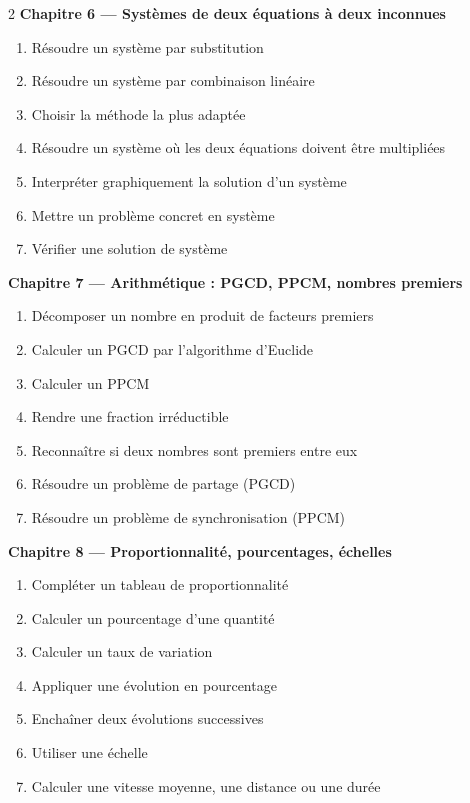 \begin{multicols}{2}
\textbf{\normalsize\color{onbo}Chapitre 6 --- Systèmes de deux équations à deux inconnues}
\begin{enumerate}[label=\arabic*.,itemsep=1pt,topsep=2pt,leftmargin=1.6em]
\item Résoudre un système par substitution
\item Résoudre un système par combinaison linéaire
\item Choisir la méthode la plus adaptée
\item Résoudre un système où les deux équations doivent être multipliées
\item Interpréter graphiquement la solution d'un système
\item Mettre un problème concret en système
\item Vérifier une solution de système
\end{enumerate}
\vspace{4pt}

\textbf{\normalsize\color{onbo}Chapitre 7 --- Arithmétique : PGCD, PPCM, nombres premiers}
\begin{enumerate}[label=\arabic*.,itemsep=1pt,topsep=2pt,leftmargin=1.6em]
\item Décomposer un nombre en produit de facteurs premiers
\item Calculer un PGCD par l'algorithme d'Euclide
\item Calculer un PPCM
\item Rendre une fraction irréductible
\item Reconnaître si deux nombres sont premiers entre eux
\item Résoudre un problème de partage (PGCD)
\item Résoudre un problème de synchronisation (PPCM)
\end{enumerate}
\vspace{4pt}

\textbf{\normalsize\color{onbo}Chapitre 8 --- Proportionnalité, pourcentages, échelles}
\begin{enumerate}[label=\arabic*.,itemsep=1pt,topsep=2pt,leftmargin=1.6em]
\item Compléter un tableau de proportionnalité
\item Calculer un pourcentage d'une quantité
\item Calculer un taux de variation
\item Appliquer une évolution en pourcentage
\item Enchaîner deux évolutions successives
\item Utiliser une échelle
\item Calculer une vitesse moyenne, une distance ou une durée
\end{enumerate}
\vspace{4pt}


\end{multicols}
